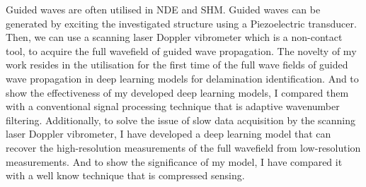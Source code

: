 \documentclass[10pt,aspectratio=169,dvipsnames]{beamer} %
\begin{document}
	\note
	{		
		Guided waves are often utilised in NDE and SHM.
		Guided waves can be generated by exciting the investigated structure using a Piezoelectric transducer.
		Then, we can use a scanning laser Doppler vibrometer which is a non-contact tool, to acquire the full wavefield of guided wave propagation.
		The novelty of my work resides in the utilisation for the first time of the full wave fields of guided wave propagation in deep learning models for delamination identification.
		And to show the effectiveness of my developed deep learning models, I compared them with a conventional signal processing technique that is adaptive wavenumber filtering.
		Additionally, to solve the issue of slow data acquisition by the scanning laser Doppler vibrometer, I have developed a deep learning model that can recover the high-resolution measurements of the full wavefield from low-resolution measurements.
		And to show the significance of my model, I have compared it with a well know technique that is compressed sensing.				
	}
\end{document}
